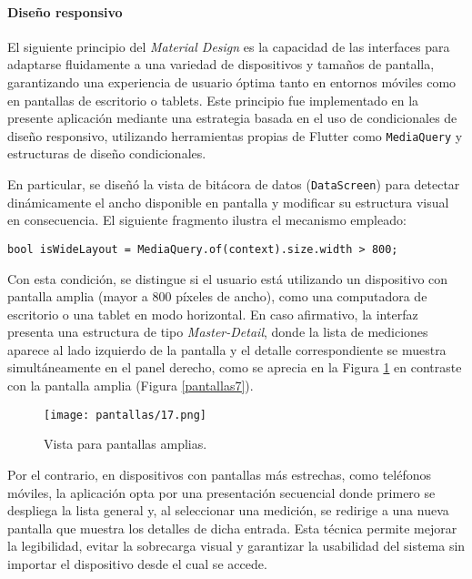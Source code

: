 \newpage
\paragraph{Diseño responsivo}


El siguiente principio del \textit{Material Design} es la capacidad de las interfaces para adaptarse fluidamente a una variedad de dispositivos y tamaños de pantalla, garantizando una experiencia de usuario óptima tanto en entornos móviles como en pantallas de escritorio o tablets. Este principio fue implementado en la presente aplicación mediante una estrategia basada en el uso de condicionales de diseño responsivo, utilizando herramientas propias de Flutter como \texttt{MediaQuery} y estructuras de diseño condicionales.

En particular, se diseñó la vista de bitácora de datos (\texttt{DataScreen}) para detectar dinámicamente el ancho disponible en pantalla y modificar su estructura visual en consecuencia. El siguiente fragmento ilustra el mecanismo empleado:

\begin{verbatim}
bool isWideLayout = MediaQuery.of(context).size.width > 800;
\end{verbatim}

Con esta condición, se distingue si el usuario está utilizando un dispositivo con pantalla amplia (mayor a 800 píxeles de ancho), como una computadora de escritorio o una tablet en modo horizontal. En caso afirmativo, la interfaz presenta una estructura de tipo \textit{Master-Detail}, donde la lista de mediciones aparece al lado izquierdo de la pantalla y el detalle correspondiente se muestra simultáneamente en el panel derecho, como se aprecia en la Figura \ref{pantallas17} en contraste con la pantalla amplia (Figura \ref{pantallas7}).

\begin{figure}[h!]
    \centering
    \texttt{[image: pantallas/17.png]}
    \caption{Vista para pantallas amplias.}
    \label{pantallas17}
\end{figure}

Por el contrario, en dispositivos con pantallas más estrechas, como teléfonos móviles, la aplicación opta por una presentación secuencial donde primero se despliega la lista general y, al seleccionar una medición, se redirige a una nueva pantalla que muestra los detalles de dicha entrada. Esta técnica permite mejorar la legibilidad, evitar la sobrecarga visual y garantizar la usabilidad del sistema sin importar el dispositivo desde el cual se accede.

